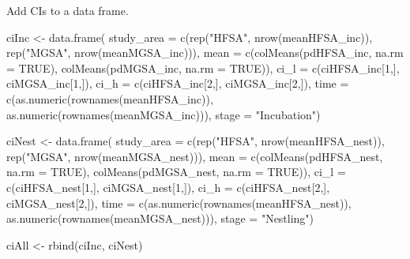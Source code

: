 \documentclass[
]{article}
\newenvironment{Shaded}{\begin{snugshade}}{\end{snugshade}}
\newcommand{\AttributeTok}[1]{\textcolor[rgb]{0.77,0.63,0.00}{#1}}
\newcommand{\ConstantTok}[1]{\textcolor[rgb]{0.00,0.00,0.00}{#1}}
\newcommand{\DecValTok}[1]{\textcolor[rgb]{0.00,0.00,0.81}{#1}}
\newcommand{\FunctionTok}[1]{\textcolor[rgb]{0.00,0.00,0.00}{#1}}
\newcommand{\NormalTok}[1]{#1}
\newcommand{\OtherTok}[1]{\textcolor[rgb]{0.56,0.35,0.01}{#1}}
\newcommand{\StringTok}[1]{\textcolor[rgb]{0.31,0.60,0.02}{#1}}
\begin{document}
Add CIs to a data frame.

\begin{Shaded}
\begin{Highlighting}[]
\NormalTok{ciInc }\OtherTok{\textless{}{-}} \FunctionTok{data.frame}\NormalTok{(}
    \AttributeTok{study\_area =} \FunctionTok{c}\NormalTok{(}\FunctionTok{rep}\NormalTok{(}\StringTok{"HFSA"}\NormalTok{, }\FunctionTok{nrow}\NormalTok{(meanHFSA\_inc)), }\FunctionTok{rep}\NormalTok{(}\StringTok{"MGSA"}\NormalTok{, }\FunctionTok{nrow}\NormalTok{(meanMGSA\_inc))),}
    \AttributeTok{mean =} \FunctionTok{c}\NormalTok{(}\FunctionTok{colMeans}\NormalTok{(pdHFSA\_inc, }\AttributeTok{na.rm =} \ConstantTok{TRUE}\NormalTok{), }\FunctionTok{colMeans}\NormalTok{(pdMGSA\_inc, }\AttributeTok{na.rm =} \ConstantTok{TRUE}\NormalTok{)),}
    \AttributeTok{ci\_l =} \FunctionTok{c}\NormalTok{(ciHFSA\_inc[}\DecValTok{1}\NormalTok{,], ciMGSA\_inc[}\DecValTok{1}\NormalTok{,]),}
    \AttributeTok{ci\_h =} \FunctionTok{c}\NormalTok{(ciHFSA\_inc[}\DecValTok{2}\NormalTok{,], ciMGSA\_inc[}\DecValTok{2}\NormalTok{,]),}
    \AttributeTok{time =} \FunctionTok{c}\NormalTok{(}\FunctionTok{as.numeric}\NormalTok{(}\FunctionTok{rownames}\NormalTok{(meanHFSA\_inc)), }\FunctionTok{as.numeric}\NormalTok{(}\FunctionTok{rownames}\NormalTok{(meanMGSA\_inc))),}
    \AttributeTok{stage =} \StringTok{"Incubation"}\NormalTok{)}


\NormalTok{ciNest }\OtherTok{\textless{}{-}} \FunctionTok{data.frame}\NormalTok{(}
    \AttributeTok{study\_area =} \FunctionTok{c}\NormalTok{(}\FunctionTok{rep}\NormalTok{(}\StringTok{"HFSA"}\NormalTok{, }\FunctionTok{nrow}\NormalTok{(meanHFSA\_nest)), }\FunctionTok{rep}\NormalTok{(}\StringTok{"MGSA"}\NormalTok{, }\FunctionTok{nrow}\NormalTok{(meanMGSA\_nest))),}
    \AttributeTok{mean =} \FunctionTok{c}\NormalTok{(}\FunctionTok{colMeans}\NormalTok{(pdHFSA\_nest, }\AttributeTok{na.rm =} \ConstantTok{TRUE}\NormalTok{), }\FunctionTok{colMeans}\NormalTok{(pdMGSA\_nest, }\AttributeTok{na.rm =} \ConstantTok{TRUE}\NormalTok{)),}
    \AttributeTok{ci\_l =} \FunctionTok{c}\NormalTok{(ciHFSA\_nest[}\DecValTok{1}\NormalTok{,], ciMGSA\_nest[}\DecValTok{1}\NormalTok{,]),}
    \AttributeTok{ci\_h =} \FunctionTok{c}\NormalTok{(ciHFSA\_nest[}\DecValTok{2}\NormalTok{,], ciMGSA\_nest[}\DecValTok{2}\NormalTok{,]),}
    \AttributeTok{time =} \FunctionTok{c}\NormalTok{(}\FunctionTok{as.numeric}\NormalTok{(}\FunctionTok{rownames}\NormalTok{(meanHFSA\_nest)), }\FunctionTok{as.numeric}\NormalTok{(}\FunctionTok{rownames}\NormalTok{(meanMGSA\_nest))),}
    \AttributeTok{stage =} \StringTok{"Nestling"}\NormalTok{)}
    
\NormalTok{ciAll }\OtherTok{\textless{}{-}} \FunctionTok{rbind}\NormalTok{(ciInc, ciNest)}
\end{Highlighting}
\end{Shaded}
\end{document}
